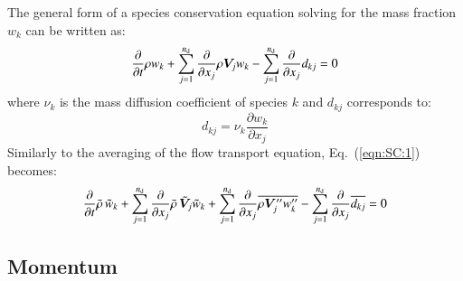 \documentclass{warpdoc}
\newcommand{\nd}{{{n}_{\rm d}}}
\newcommand{\mfd}{\displaystyle}
\begin{document}
The general form of a species conservation equation
solving for the mass fraction $w_k$ can be written as:
%
\begin{equation}
  \frac{\partial }{\partial t} \rho w_k
 +  \sum_{j=1}^{\nd} \frac{\partial }{\partial x_j}  \rho  \bm{V}_j  w_k
 -  \sum_{j=1}^{\nd} \frac{\partial }{\partial x_j}  d_{kj}  = 0
  \label{eqn:SC:1}
\end{equation}
%
where $\nu_k$ is the mass diffusion coefficient of species $k$
and $d_{kj}$ corresponds to:
%
\begin{equation}
  d_{kj}=\nu_k \frac{\partial w_k}{\partial x_j}
  \label{eqn:dkj}
\end{equation}
%
Similarly to the averaging of the flow transport equation, Eq.\ (\ref{eqn:SC:1}) becomes:
%
\begin{equation}
  \mfd\frac{\partial}{\partial t}  \wbar{\rho}\,  {\wtilde{w}_k}
      +  \sum_{j=1}^{\nd} \frac{\partial }{\partial x_j}
        \wbar{\rho}\, {\wtilde{\bm{V}}_j} {\wtilde{w}_k}
      + \sum_{j=1}^{\nd} \frac{\partial }{\partial x_j} 
            \overline{\rho \bm{V}_j^{\prime\prime} w_k^{\prime\prime}}
      -  \sum_{j=1}^{\nd} \frac{\partial }{\partial x_j}
        \overline{
             d_{kj}
        }
      = 0
  \label{eqn:SC:final}
\end{equation}
%




\subsection{Momentum}
\end{document}
